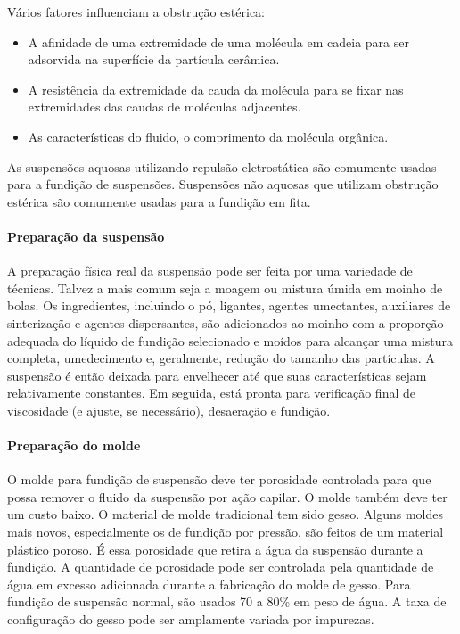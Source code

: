 Vários fatores influenciam a obstrução estérica:

\begin{itemize}
    \item A afinidade de uma extremidade de uma molécula em cadeia para ser adsorvida na superfície da partícula cerâmica.
    \item A resistência da extremidade da cauda da molécula para se fixar nas extremidades das caudas de moléculas adjacentes.
    \item As características do fluido, o comprimento da molécula orgânica.
\end{itemize}

As suspensões aquosas utilizando repulsão eletrostática são comumente usadas para a fundição de suspensões. Suspensões não aquosas que utilizam obstrução estérica são comumente usadas para a fundição em fita.

\paragraph*{Preparação da suspensão}

A preparação física real da suspensão pode ser feita por uma variedade de técnicas. Talvez a mais comum seja a moagem ou mistura úmida em moinho de bolas. Os ingredientes, incluindo o pó, ligantes, agentes umectantes, auxiliares de sinterização e agentes dispersantes, são adicionados ao moinho com a proporção adequada do líquido de fundição selecionado e moídos para alcançar uma mistura completa, umedecimento e, geralmente, redução do tamanho das partículas. A suspensão é então deixada para envelhecer até que suas características sejam relativamente constantes. Em seguida, está pronta para verificação final de viscosidade (e ajuste, se necessário), desaeração e fundição.

\paragraph*{Preparação do molde}

O molde para fundição de suspensão deve ter porosidade controlada para que possa remover o fluido da suspensão por ação capilar. O molde também deve ter um custo baixo. O material de molde tradicional tem sido gesso. Alguns moldes mais novos, especialmente os de fundição por pressão, são feitos de um material plástico poroso. É essa porosidade que retira a água da suspensão durante a fundição. A quantidade de porosidade pode ser controlada pela quantidade de água em excesso adicionada durante a fabricação do molde de gesso. Para fundição de suspensão normal, são usados 70 a 80\% em peso de água. A taxa de configuração do gesso pode ser amplamente variada por impurezas.

